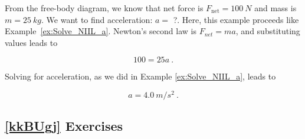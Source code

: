 \documentclass{article}
\numberwithin{equation}{section}
\numberwithin{figure}{section}
\begin{document}
\Solution From the free-body diagram, we know that net force is $F_{\text{net}} = \SI{100}{N}$ and mass is $m = \SI{25}{kg}$. We want to find acceleration: $a =$ ?. Here, this example proceeds like Example~\ref{ex:Solve_NIIL_a}. Newton's second law is $F_{net} = ma$, and substituting values leads to

\begin{equation*}
    100 = 25 a\ .
\end{equation*}

Solving for acceleration, as we did in Example \ref{ex:Solve_NIIL_a}, leads to

\begin{equation*}
    a = \SI{4.0}{m/s^2}\ .
\end{equation*}

\vspace{2ex}

\cyanhrule

\subsection*{\ref{kkBUgj} Exercises}
\end{document}
